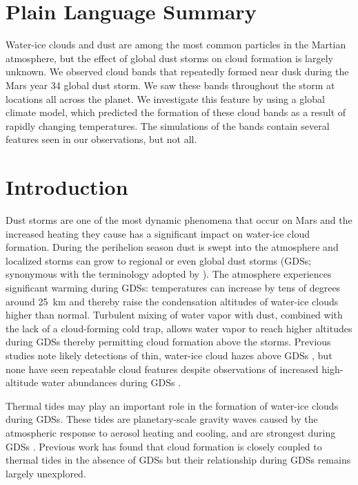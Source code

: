 \documentclass[draft]{agujournal2019}
\begin{document}
\section*{Plain Language Summary}
Water-ice clouds and dust are among the most common particles in the Martian atmosphere, but the effect of global dust storms on cloud formation is largely unknown. We observed cloud bands that repeatedly formed near dusk during the Mars year 34 global dust storm. We saw these bands throughout the storm at locations all across the planet. We investigate this feature by using a global climate model, which predicted the formation of these cloud bands as a result of rapidly changing temperatures. The simulations of the bands contain several features seen in our observations, but not all.

\section{Introduction}
Dust storms are one of the most dynamic phenomena that occur on Mars and the increased heating they cause has a significant impact on water-ice cloud formation. During the perihelion season dust is swept into the atmosphere and localized storms can grow to regional or even global dust storms (GDSs; synonymous with the terminology adopted by ). The atmosphere experiences significant warming during GDSs: temperatures can increase by tens of degrees around 25~km \cite{Conrath75, Smith02} and thereby raise the condensation altitudes of water-ice clouds higher than normal. Turbulent mixing of water vapor with dust, combined with the lack of a cloud-forming cold trap, allows water vapor to reach higher altitudes during GDSs thereby permitting cloud formation above the storms. Previous studies note likely detections of thin, water-ice cloud hazes above GDSs \cite{Strausberg05, Clancy10}, but none have seen repeatable cloud features despite observations of increased high-altitude water abundances during GDSs \cite{Federova18}.

Thermal tides may play an important role in the formation of water-ice clouds during GDSs. These tides are planetary-scale gravity waves caused by the atmospheric response to aerosol heating and cooling, and are strongest during GDSs \cite{MarsAtm_The_Global_Circulation}. Previous work has found that cloud formation is closely coupled to thermal tides in the absence of GDSs \cite{Wilson14, MarsAtm_The_Global_Circulation, Hartwick19} but their relationship during GDSs remains largely unexplored. 
\end{document}
